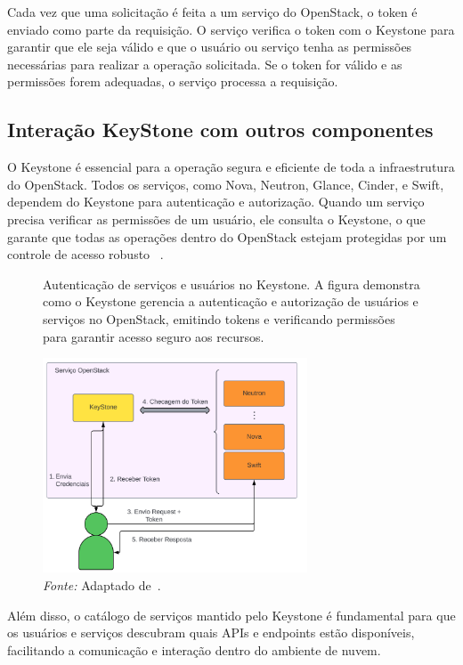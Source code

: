 Cada vez que uma solicitação é feita a um serviço do OpenStack, o token é enviado como parte da requisição. O serviço verifica o token com o Keystone para garantir que ele seja válido e que o usuário ou serviço tenha as permissões necessárias para realizar a operação solicitada. Se o token for válido e as permissões forem adequadas, o serviço processa a requisição.

\subsection{Interação KeyStone com outros componentes}
O Keystone é essencial para a operação segura e eficiente de toda a infraestrutura do OpenStack. Todos os serviços, como Nova, Neutron, Glance, Cinder, e Swift, dependem do Keystone para autenticação e autorização. Quando um serviço precisa verificar as permissões de um usuário, ele consulta o Keystone, o que garante que todas as operações dentro do OpenStack estejam protegidas por um controle de acesso robusto ~\citep{da2018self}.

\begin{figure}[htbp]
  \centering
  \caption{Autenticação de serviços e usuários no Keystone. A figura demonstra como o Keystone gerencia a autenticação e autorização de usuários e serviços no OpenStack, emitindo tokens e verificando permissões para garantir acesso seguro aos recursos.}
  \includegraphics[width=0.7\textwidth]{images/keystone_architecture_2.png}
  \caption*{\textit{Fonte:} Adaptado de~\citep{da2018self}.}
  \label{fig:keystone_architecture}
\end{figure}


Além disso, o catálogo de serviços mantido pelo Keystone é fundamental para que os usuários e serviços descubram quais APIs e endpoints estão disponíveis, facilitando a comunicação e interação dentro do ambiente de nuvem.

